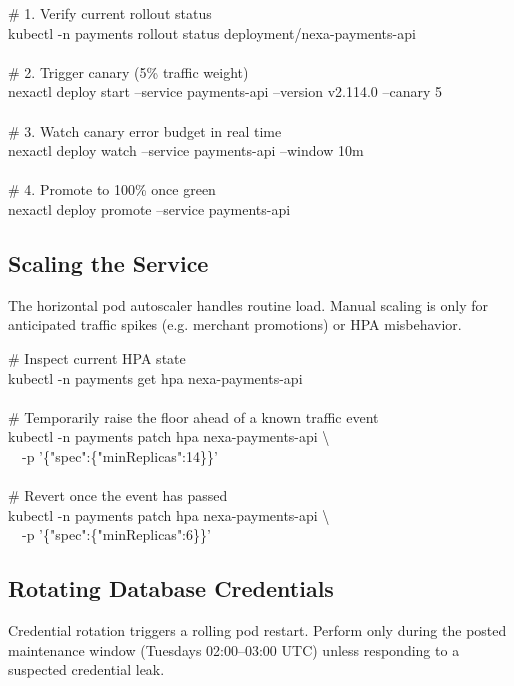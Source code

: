 \documentclass[11pt,a4paper,parskip=half]{scrartcl}
\begin{document}
\begin{cmdbox}
\# 1. Verify current rollout status\\
kubectl -n payments rollout status deployment/nexa-payments-api\\
\\
\# 2. Trigger canary (5\% traffic weight)\\
nexactl deploy start --service payments-api --version v2.114.0 --canary 5\\
\\
\# 3. Watch canary error budget in real time\\
nexactl deploy watch --service payments-api --window 10m\\
\\
\# 4. Promote to 100\% once green\\
nexactl deploy promote --service payments-api
\end{cmdbox}

\subsection{Scaling the Service}

The horizontal pod autoscaler handles routine load. Manual scaling is only for
anticipated traffic spikes (e.g. merchant promotions) or HPA misbehavior.

\begin{cmdbox}
\# Inspect current HPA state\\
kubectl -n payments get hpa nexa-payments-api\\
\\
\# Temporarily raise the floor ahead of a known traffic event\\
kubectl -n payments patch hpa nexa-payments-api \textbackslash\\
\ \ -p '\{"spec":\{"minReplicas":14\}\}'\\
\\
\# Revert once the event has passed\\
kubectl -n payments patch hpa nexa-payments-api \textbackslash\\
\ \ -p '\{"spec":\{"minReplicas":6\}\}'
\end{cmdbox}

\subsection{Rotating Database Credentials}

\begin{warnbox}
Credential rotation triggers a rolling pod restart. Perform only during the
posted maintenance window (Tuesdays 02:00--03:00 UTC) unless responding to a
suspected credential leak.
\end{warnbox}
\end{document}
